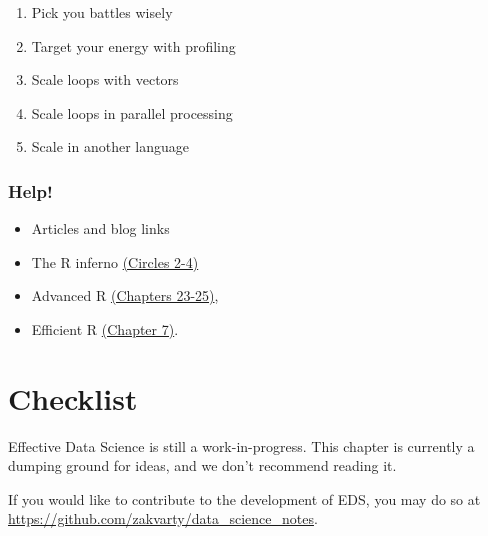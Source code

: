 \documentclass[
  letterpaper,
  DIV=11,
  numbers=noendperiod]{scrreprt}
\providecommand{\tightlist}{%
  \setlength{\itemsep}{0pt}\setlength{\parskip}{0pt}}\usepackage{longtable,booktabs,array}
\begin{document}
\begin{enumerate}
\def\labelenumi{\arabic{enumi}.}
\tightlist
\item
  Pick you battles wisely
\item
  Target your energy with profiling
\item
  Scale loops with vectors
\item
  Scale loops in parallel processing
\item
  Scale in another language
\end{enumerate}

\subsection*{Help!}\label{help}

\begin{itemize}
\tightlist
\item
  Articles and blog links
\item
  The R inferno
  \href{https://www.burns-stat.com/pages/Tutor/R_inferno.pdf}{(Circles
  2-4)}
\item
  Advanced R \href{https://adv-r.hadley.nz/techniques.html}{(Chapters
  23-25)},
\item
  Efficient R
  \href{https://csgillespie.github.io/efficientR/performance.html\#prerequisites-6}{(Chapter
  7)}.
\end{itemize}

\chapter*{Checklist}\label{production-checklist}


\begin{tcolorbox}[enhanced jigsaw, coltitle=black, opacityback=0, left=2mm, titlerule=0mm, breakable, colback=white, opacitybacktitle=0.6, colbacktitle=quarto-callout-important-color!10!white, bottomtitle=1mm, toptitle=1mm, colframe=quarto-callout-important-color-frame, bottomrule=.15mm, leftrule=.75mm, title=\textcolor{quarto-callout-important-color}{\faExclamation}\hspace{0.5em}{Important}, toprule=.15mm, arc=.35mm, rightrule=.15mm]

Effective Data Science is still a work-in-progress. This chapter is
currently a dumping ground for ideas, and we don't recommend reading it.

If you would like to contribute to the development of EDS, you may do so
at \url{https://github.com/zakvarty/data_science_notes}.

\end{tcolorbox}
\end{document}
